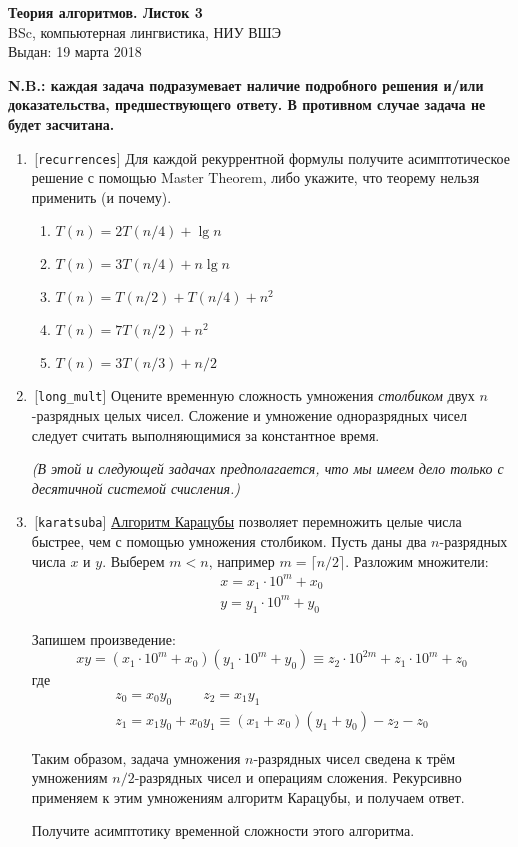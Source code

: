 \documentclass[12pt,a4paper]{report}
\begin{document}
\begin{center}
\textbf{\large{Теория алгоритмов. Листок 3}}\\
BSc, компьютерная лингвистика, НИУ ВШЭ\\
Выдан: 19 марта 2018\\
\end{center}

{\bf N.B.: каждая задача подразумевает наличие подробного решения и/или доказательства, предшествующего ответу. В противном случае задача не будет засчитана.}

\begin{enumerate}
  \item\,[{\tt recurrences}] Для каждой рекуррентной формулы получите асимптотическое решение с помощью Master Theorem, либо укажите, что теорему нельзя применить (и почему).

  \begin{enumerate}
    \item $T(n) = 2T(n/4) + \lg n$
    \item $T(n) = 3T(n/4) + n \lg n$
    \item $T(n) = T(n/2) + T(n/4) + n^2$
    \item $T(n) = 7T(n/2) + n^2$
    \item $T(n) = 3T(n/3) + n/2$
  \end{enumerate}

  \item\,[{\tt long\_mult}] Оцените временную сложность умножения {\em столбиком} двух $n$-разрядных целых чисел. Сложение и умножение одноразрядных чисел следует считать выполняющимися за константное время.

  {\em (В этой и следующей задачах предполагается, что мы имеем дело только с десятичной системой счисления.)}

  \item\,[{\tt karatsuba}] \href{https://en.wikipedia.org/wiki/Karatsuba_algorithm}{Алгоритм Карацубы} позволяет перемножить целые числа быстрее, чем с помощью умножения столбиком. Пусть даны два $n$-разрядных числа $x$ и $y$. Выберем $m<n$, например $m = \lceil n/2 \rceil$. Разложим множители:
  $$
  \begin{gathered}
  x = x_1 \cdot 10^m + x_0\\
  y = y_1 \cdot 10^m + y_0
  \end{gathered}
  $$

  Запишем произведение:
  $$
  \boxed{xy} = (x_1 \cdot 10^m + x_0)(y_1 \cdot 10^m + y_0)
       \equiv \boxed{z_2 \cdot 10^{2m} + z_1 \cdot 10^{m} + z_0}
  $$%
  где%
  $$
  \begin{gathered}
  z_0 = x_0 y_0   ~~~~~~~~~~  z_2 = x_1 y_1\\
  z_1 = x_1 y_0 + x_0 y_1 \equiv (x_1 + x_0)(y_1 + y_0) - z_2 - z_0
  \end{gathered}
  $$%

  Таким образом, задача умножения $n$-разрядных чисел сведена к трём умножениям $n/2$-разрядных чисел и операциям сложения. Рекурсивно применяем к этим умножениям алгоритм Карацубы, и получаем ответ.

  Получите асимптотику временной сложности этого алгоритма.
\end{enumerate}
\end{document}

